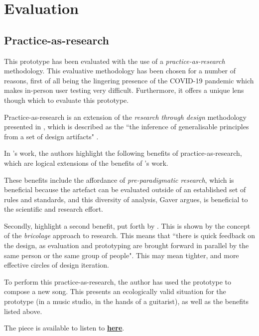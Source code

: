 \section{Evaluation}

\subsection{Practice-as-research}

This prototype has been evaluated with the use of a \textit{practice-as-research} methodology. This evaluative methodology has been chosen for a number of reasons, first of all being the lingering presence of the COVID-19 pandemic which makes in-person user testing very difficult. Furthermore, it offers a unique lens though which to evaluate this prototype. 

Practice-as-research is an extension of the \textit{research through design} methodology presented in \cite{gaver_what_2012}, which is described as the ``the inference of generalisable principles from a set of design artifacts" \citep{martelloni_guitar_2021}.

In \cite{martelloni_guitar_2021}'s work, the authors highlight the following benefits of practice-as-research, which are logical extensions of the benefits of \cite{gaver_what_2012}'s work. 

These benefits include the affordance of \textit{pre-paradigmatic research}, which is beneficial because the artefact can be evaluated outside of an established set of rules and standards, and this diversity of analysis, Gaver argues, is beneficial to the scientific and research effort.     

Secondly, \cite{martelloni_guitar_2021} highlight a second benefit, put forth by \cite{carey_reection_2016}. This is shown by the concept of the \textit{bricolage} approach to research. This means that ``there is quick feedback on the design, as evaluation and prototyping are brought forward in parallel by the same person or the same group of people". This may mean tighter, and more effective circles of design iteration.

To perform this practice-as-research, the author has used the prototype to compose a new song. This presents an ecologically valid situation for the prototype (in a music studio, in the hands of a guitarist), as well as the benefits listed above.

The piece is available to listen to \href{https://drive.google.com/file/d/1AR7ZPBJgG3uJql0nhqeoFNKMg3zadOTz/view?usp=sharing}{\textbf{here}}. 

